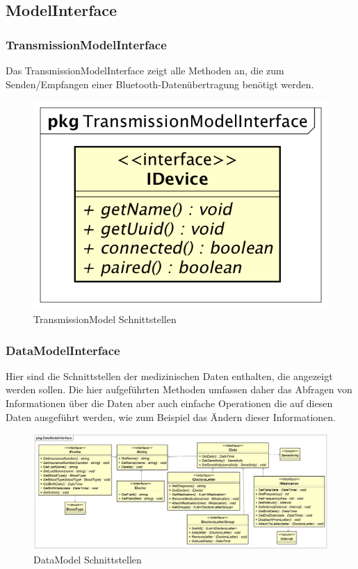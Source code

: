 \documentclass[a4paper]{scrreprt}
\begin{document}
\subsection{ModelInterface}
\subsubsection{TransmissionModelInterface}

Das TransmissionModelInterface zeigt alle Methoden an, die zum Senden/Empfangen einer Bluetooth-Datenübertragung benötigt werden. %

\begin{figure}[H]
\centering
\includegraphics[width=0.45\textheight]{graphics/Klassendiagramme/Model/TransmissionModelInterfacePackage.png}
\caption{TransmissionModel Schnittstellen}
\end{figure}

\subsubsection{DataModelInterface}
Hier sind die Schnittstellen der medizinischen Daten enthalten, die angezeigt werden sollen. Die hier aufgeführten Methoden umfassen daher das Abfragen von Informationen über die Daten aber auch einfache Operationen die auf diesen Daten ausgeführt werden, wie zum Beispiel das Ändern dieser Informationen.

\begin{figure}[H]
\centering
\includegraphics[width=0.75\textheight]{graphics/Klassendiagramme/Model/DataModelInterfacePackage.png}
\caption{DataModel Schnittstellen}
\end{figure}
\end{document}
